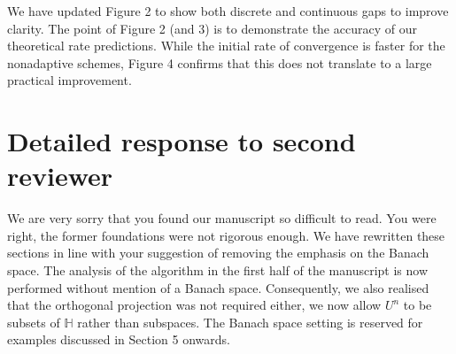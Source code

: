 \documentclass[12pt]{article}
\newcommand{\F}[1]{\mathbb{#1}}
\begin{document}
\begin{enumerate}
	We have updated Figure 2 to show both discrete and continuous gaps to improve clarity. The point of Figure 2 (and 3) is to demonstrate the accuracy of our theoretical rate predictions. While the initial rate of convergence is faster for the nonadaptive schemes, Figure 4 confirms that this does not translate to a large practical improvement.
\end{enumerate}

\section{Detailed response to second reviewer}
We are very sorry that you found our manuscript so difficult to read. You were right, the former foundations were not rigorous enough. We have rewritten these sections in line with your suggestion of removing the emphasis on the Banach space. The analysis of the algorithm in the first half of the manuscript is now performed without mention of a Banach space. Consequently, we also realised that the orthogonal projection was not required either, we now allow $U^n$ to be subsets of $\F H$ rather than subspaces. The Banach space setting is reserved for examples discussed in Section 5 onwards.
\end{document}
